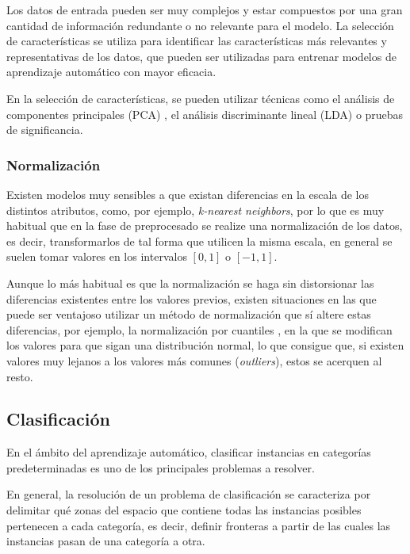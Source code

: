 Los datos de entrada pueden ser muy complejos y estar compuestos por una gran
cantidad de información redundante o no relevante para el modelo. La selección
de características se utiliza para identificar  las características más
relevantes y representativas de los datos, que pueden ser utilizadas para
entrenar modelos de aprendizaje automático con mayor eficacia.

En la selección de características, se pueden utilizar técnicas como el análisis
de componentes principales (PCA) \cite{mackiewicz1993principal}, el análisis
discriminante lineal (LDA) \cite{xanthopoulos2013linear} o pruebas de
significancia.

\subsubsection{Normalización}

Existen modelos muy sensibles a que existan diferencias en la escala de los
distintos atributos, como, por ejemplo, \textit{k-nearest neighbors}, por lo que
es muy habitual que en la fase de preprocesado se realize una normalización de
los datos, es decir, transformarlos de tal forma que utilicen la misma escala,
en general se suelen tomar valores en los intervalos $[0, 1]$ o $[-1, 1]$.

Aunque lo más habitual es que la normalización se haga sin distorsionar las
diferencias existentes entre los valores previos, existen situaciones en las que
puede ser ventajoso utilizar un método de normalización que sí altere estas
diferencias, por ejemplo, la normalización por cuantiles
\cite{enwiki:1138433182}, en la que se modifican los valores para que sigan una
distribución normal, lo que consigue que, si existen valores muy lejanos a los
valores más comunes (\textit{outliers}), estos se acerquen al resto. 

\subsection{Clasificación}

En el ámbito del aprendizaje automático, clasificar instancias en categorías
predeterminadas es uno de los principales problemas a resolver.

En general, la resolución de un problema de clasificación se caracteriza por
delimitar qué zonas del espacio que contiene todas las instancias posibles
pertenecen a cada categoría, es decir, definir fronteras a partir de las cuales
las instancias pasan de una categoría a otra.

